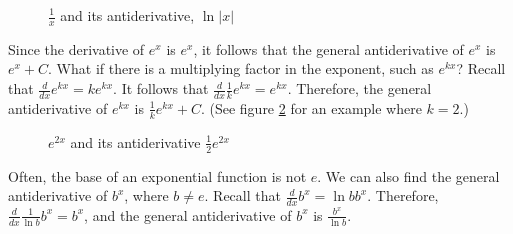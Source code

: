 \begin{figure}[htpb]
\centering
 \caption{$\frac{1}{x}$ and its antiderivative, $\ln{|x|}$}
 \label{fig:naturallog}
\end{figure}

Since the derivative of $e^{x}$ is $e^{x}$, it follows that the general 
antiderivative of $e^{x}$ is $e^{x} + C$. What if there is a 
multiplying factor in the exponent, such as $e^{kx}$? Recall that 
$\frac{d}{dx} e^{kx} = k e^{kx}$. It follows that $\frac{d}{dx} 
\frac{1}{k} e^{kx} = e^{kx}$. Therefore, the general antiderivative of 
$e^{kx}$ is $\frac{1}{k} e^{kx} + C$. (See figure \ref{fig:antiexp} 
for an example where $k = 2$.)

\begin{figure}[htbp]
\centering
	\caption{$e^{2x}$ and its antiderivative $\frac{1}{2}e^{2x}$}
	\label{fig:antiexp}
\end{figure}

Often, the base of an exponential function is not $e$. We can also find 
the general antiderivative of $b^{x}$, where $b \neq e$. Recall that 
$\frac{d}{dx} b^x = \ln{b} b^x$. Therefore, $\frac{d}{dx} \frac{1}{\ln{b}} 
b^x = b^x$, and the general antiderivative of $b^x$ is $\frac{b^x}{\ln{b}}$. 


